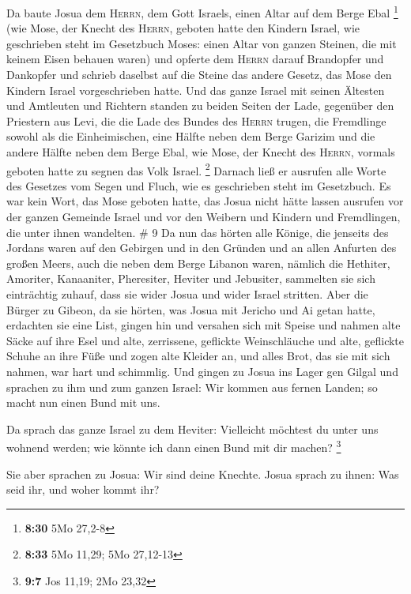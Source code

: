  Da baute Josua dem \textsc{Herrn}, dem Gott Israels,
einen Altar auf dem Berge Ebal \footnote{\textbf{8:30} 5Mo 27,2-8}
 (wie Mose, der Knecht des \textsc{Herrn}, geboten hatte
den Kindern Israel, wie geschrieben steht im Gesetzbuch Moses: einen
Altar von ganzen Steinen, die mit keinem Eisen behauen waren) und
opferte dem \textsc{Herrn} darauf Brandopfer und Dankopfer
 und schrieb daselbst auf die Steine das andere Gesetz,
das Mose den Kindern Israel vorgeschrieben hatte.  Und
das ganze Israel mit seinen Ältesten und Amtleuten und Richtern standen
zu beiden Seiten der Lade, gegenüber den Priestern aus Levi, die die
Lade des Bundes des \textsc{Herrn} trugen, die Fremdlinge sowohl als die
Einheimischen, eine Hälfte neben dem Berge Garizim und die andere Hälfte
neben dem Berge Ebal, wie Mose, der Knecht des \textsc{Herrn}, vormals
geboten hatte zu segnen das Volk Israel. \footnote{\textbf{8:33} 5Mo
  11,29; 5Mo 27,12-13}  Darnach ließ er ausrufen alle
Worte des Gesetzes vom Segen und Fluch, wie es geschrieben steht im
Gesetzbuch.  Es war kein Wort, das Mose geboten hatte,
das Josua nicht hätte lassen ausrufen vor der ganzen Gemeinde Israel und
vor den Weibern und Kindern und Fremdlingen, die unter ihnen wandelten.
\# 9  Da nun das hörten alle Könige, die jenseits des
Jordans waren auf den Gebirgen und in den Gründen und an allen Anfurten
des großen Meers, auch die neben dem Berge Libanon waren, nämlich die
Hethiter, Amoriter, Kanaaniter, Pheresiter, Heviter und Jebusiter,
 sammelten sie sich einträchtig zuhauf, dass sie wider
Josua und wider Israel stritten.  Aber die Bürger zu
Gibeon, da sie hörten, was Josua mit Jericho und Ai getan hatte,
erdachten sie eine List,  gingen hin und versahen sich mit
Speise und nahmen alte Säcke auf ihre Esel  und alte,
zerrissene, geflickte Weinschläuche und alte, geflickte Schuhe an ihre
Füße und zogen alte Kleider an, und alles Brot, das sie mit sich nahmen,
war hart und schimmlig.  Und gingen zu Josua ins Lager gen
Gilgal und sprachen zu ihm und zum ganzen Israel: Wir kommen aus fernen
Landen; so macht nun einen Bund mit uns.

 Da sprach das ganze Israel zu dem Heviter: Vielleicht
möchtest du unter uns wohnend werden; wie könnte ich dann einen Bund mit
dir machen? \footnote{\textbf{9:7} Jos 11,19; 2Mo 23,32}

 Sie aber sprachen zu Josua: Wir sind deine Knechte. Josua
sprach zu ihnen: Was seid ihr, und woher kommt ihr?

